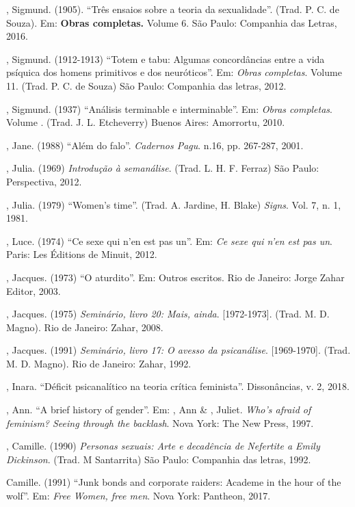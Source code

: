 , Sigmund. (1905). ``Três ensaios sobre a teoria da sexualidade''.
(Trad. P. C. de Souza). Em: \textbf{Obras completas.} Volume 6. São
Paulo: Companhia das Letras, 2016.

, Sigmund. (1912-1913) ``Totem e tabu: Algumas concordâncias entre
a vida psíquica dos homens primitivos e dos neuróticos''. Em:
\emph{Obras completas}. Volume 11. (Trad. P. C. de Souza) São Paulo:
Companhia das letras, 2012.

, Sigmund. (1937) ``Análisis terminable e interminable''. Em:
\emph{Obras completas}. Volume . (Trad. J. L. Etcheverry) Buenos
Aires: Amorrortu, 2010.

, Jane. (1988) ``Além do falo''. \emph{Cadernos Pagu}. n.16, pp.
267-287, 2001.

, Julia. (1969) \emph{Introdução à semanálise}. (Trad. L. H. F.
Ferraz) São Paulo: Perspectiva, 2012.

, Julia. (1979) ``Women's time''. (Trad. A. Jardine, H. Blake)
\emph{Signs}. Vol. 7, n. 1, 1981.

, Luce. (1974) ``Ce sexe qui n'en est pas un''. Em: \emph{Ce
sexe qui n'en est pas un}. Paris: Les Éditions de Minuit, 2012.

, Jacques. (1973) ``O aturdito''. Em: Outros escritos. Rio de
Janeiro: Jorge Zahar Editor, 2003.

, Jacques. (1975) \emph{Seminário, livro 20: Mais, ainda}.
{[}1972-1973{]}. (Trad. M. D. Magno). Rio de Janeiro: Zahar, 2008.

, Jacques. (1991) \emph{Seminário, livro 17: O avesso da
psicanálise}. {[}1969-1970{]}. (Trad. M. D. Magno). Rio de Janeiro:
Zahar, 1992.

, Inara. ``Déficit psicanalítico na teoria crítica feminista''.
Dissonâncias, v. 2, 2018.

, Ann. ``A brief history of gender''. Em: , Ann \& ,
Juliet. \emph{Who's afraid of feminism? Seeing through the backlash}.
Nova York: The New Press, 1997.

, Camille. (1990) \emph{Personas sexuais: Arte e decadência de
Nefertite a Emily Dickinson}. (Trad. M Santarrita) São Paulo: Companhia
das letras, 1992.

 Camille. (1991) ``Junk bonds and corporate raiders: Academe in
the hour of the wolf''. Em: \emph{Free Women, free men}. Nova York:
Pantheon, 2017.

